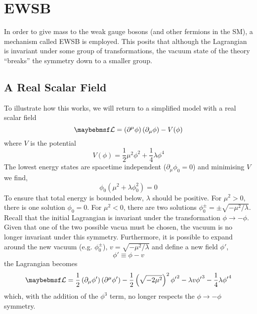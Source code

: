 \section{\acl{EWSB}}
\label{sec:theory_ewsb}
In order to give mass to the weak gauge bosons (and other fermions in the
\ac{SM}), a mechanism called \acl{EWSB} is employed. This posits that although
the Lagrangian is invariant under some group of transformations, the vacuum
state of the theory ``breaks'' the symmetry down to a smaller group.

\subsection{A Real Scalar Field}
To illustrate how this works, we will return to a simplified model with a real
scalar field
\begin{equation}
\lagrangiand = \left(\partial^{\mu}\phi\right)\left(\partial_{\mu}\phi\right)
-V(\phi)
\end{equation}
where $V$ is the potential
\begin{equation}
V(\phi) = \frac{1}{2}\mu^2\phi^2 + \frac{1}{4}\lambda\phi^4
\end{equation}
The lowest energy states are spacetime independent ($\partial_{\mu} \phi_0 = 0$)
and minimising $V$ we find,
\begin{equation}
\phi_0 \left (\mu^2 + \lambda\phi_0^2\right) = 0
\end{equation}
To ensure that total energy is bounded below, $\lambda$ should be positive. For
$\mu^2 > 0$, there is one solution $\phi_0 = 0$. For $\mu^2 < 0$, there are two
solutions $\phi^\pm_0 = \pm \sqrt{-\mu^2/\lambda}$. Recall that the initial
Lagrangian is invariant under the transformation $\phi \longrightarrow
-\phi$. Given that one of the two possible vacua must be chosen, the vacuum is
no longer invariant under this symmetry. Furthermore, it is possible to expand
around the new vacuum (e.g. $\phi_0^\pm$), $v=\sqrt{-\mu^2/\lambda}$ and define
a new field $\phi'$,
\begin{equation}
\phi' \equiv \phi - v
\end{equation}
the Lagrangian becomes
\begin{equation}
\lagrangiand = \frac{1}{2}
\left(\partial_{\mu}\phi'\right)\left(\partial^{\mu}\phi'\right)
-\frac{1}{2}\left(\sqrt{-2\mu^2}\right)^2{\phi'}^2 - \lambda v {\phi'}^3
-\frac{1}{4}\lambda{\phi'}^4
\end{equation}
which, with the addition of the $\phi^3$ term, no longer respects the $\phi
\longrightarrow -\phi$ symmetry.

